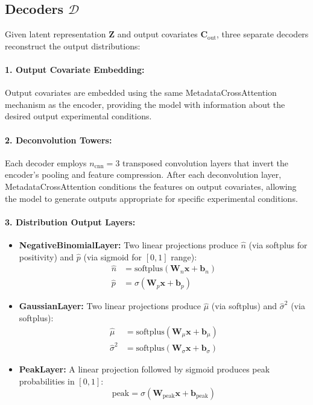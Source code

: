 \subsection{Decoders $\mathcal{D}$}

Given latent representation $\mathbf{Z}$ and output covariates $\mathbf{C}_{\text{out}}$, three separate decoders reconstruct the output distributions:

\paragraph{1. Output Covariate Embedding:}
Output covariates are embedded using the same MetadataCrossAttention mechanism as the encoder, providing the model with information about the desired output experimental conditions.

\paragraph{2. Deconvolution Towers:}
Each decoder employs $n_{\text{cnn}} = 3$ transposed convolution layers that invert the encoder's pooling and feature compression. After each deconvolution layer, MetadataCrossAttention conditions the features on output covariates, allowing the model to generate outputs appropriate for specific experimental conditions.

\paragraph{3. Distribution Output Layers:}
\begin{itemize}
    \item \textbf{NegativeBinomialLayer:} Two linear projections produce $\hat{n}$ (via softplus for positivity) and $\hat{p}$ (via sigmoid for $[0,1]$ range):
    \begin{align}
        \hat{n} &= \text{softplus}(\mathbf{W}_n \mathbf{x} + \mathbf{b}_n) \\
        \hat{p} &= \sigma(\mathbf{W}_p \mathbf{x} + \mathbf{b}_p)
    \end{align}

    \item \textbf{GaussianLayer:} Two linear projections produce $\hat{\mu}$ (via softplus) and $\hat{\sigma}^2$ (via softplus):
    \begin{align}
        \hat{\mu} &= \text{softplus}(\mathbf{W}_\mu \mathbf{x} + \mathbf{b}_\mu) \\
        \hat{\sigma}^2 &= \text{softplus}(\mathbf{W}_\sigma \mathbf{x} + \mathbf{b}_\sigma)
    \end{align}

    \item \textbf{PeakLayer:} A linear projection followed by sigmoid produces peak probabilities in $[0,1]$:
    \begin{equation}
        \text{peak} = \sigma(\mathbf{W}_{\text{peak}} \mathbf{x} + \mathbf{b}_{\text{peak}})
    \end{equation}
\end{itemize}


